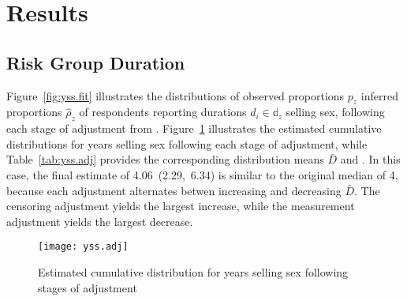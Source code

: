 \section{Results}
\subsection{Risk Group Duration}\label{res.yss}
Figure~\ref{fig:yss.fit} illustrates the distributions of
observed proportions $p_z$ \vs inferred proportions $\hat{\rho}_z$ of respondents
reporting durations $d_i \in \mathbb{d}_z$ selling sex,
following each stage of adjustment from .
Figure~\ref{fig:yss.adj} illustrates
the estimated cumulative distributions for years selling sex following each stage of adjustment,
while Table~\ref{tab:yss.adj} provides the corresponding distribution means $\bar{D}$ and \ci.
In this case, the final estimate of 4.06~(2.29,~6.34) is similar to the original median of 4,
because each adjustment alternates betwen increasing and decreasing $\bar{D}$.
The censoring adjustment yields the largest increase, while
the measurement adjustment yields the largest decrease.
\begin{figure}[h]
  \centering\texttt{[image: yss.adj]}
  \caption{Estimated cumulative distribution for years selling sex
    following stages of adjustment}
  \label{fig:yss.adj}
\end{figure}
